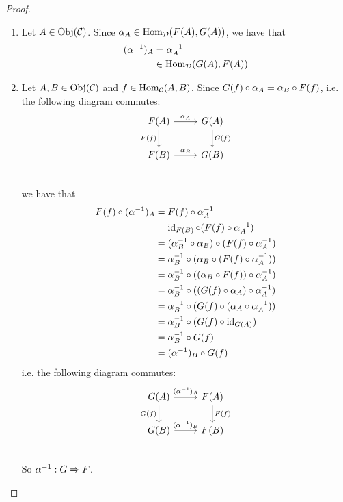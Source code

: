 \documentclass{book}
\begin{document}
	\begin{proof}\
		\begin{enumerate}
			\item Let $A \in \operatorname{Obj}(\mathcal{C})$. Since $\alpha_A \in \operatorname{Hom}_{\mathcal{D}}(F(A), G(A))$, we have that 
			\begin{align*}
				(\alpha^{-1})_A
				& = \alpha_A^{-1} \\
				& \in \operatorname{Hom}_{\mathcal{D}}(G(A), F(A))
			\end{align*}
			\item Let $A, B \in \operatorname{Obj}(\mathcal{C})$ and $f \in \operatorname{Hom}_{\mathcal{C}}(A,B)$. Since $G(f) \circ \alpha_A = \alpha_B \circ F(f)$, i.e. the following diagram commutes:
			\[ 
			\begin{tikzcd}
				F(A)  \arrow[r, "\al_A"]  \arrow[d, "F(f)"']  & G(A)   \arrow[d, "G(f)"]\\
				F(B) \arrow[r, "\al_B"] &  G(B) \\
			\end{tikzcd}
			\]
			we have that 
			\begin{align*}
				F(f) \circ (\alpha^{-1})_A 
				& = F(f) \circ \alpha_A^{-1} \\
				& = \operatorname{id}_{F(B)} \circ (F(f) \circ \alpha_A^{-1}) \\
				& = (\alpha_B^{-1} \circ \alpha_B) \circ (F(f) \circ \alpha_A^{-1}) \\
				& = \alpha_B^{-1} \circ (\alpha_B \circ (F(f) \circ \alpha_A^{-1})) \\
				& = \alpha_B^{-1} \circ ((\alpha_B \circ F(f)) \circ \alpha_A^{-1}) \\
				& = \alpha_B^{-1} \circ ((G(f) \circ \alpha_A) \circ \alpha_A^{-1}) \\
				& = \alpha_B^{-1} \circ (G(f) \circ (\alpha_A \circ \alpha_A^{-1})) \\
				& = \alpha_B^{-1} \circ (G(f) \circ \operatorname{id}_{G(A)}) \\
				& = \alpha_B^{-1} \circ G(f) \\
				& = (\alpha^{-1})_B \circ G(f) 
			\end{align*}
			i.e. the following diagram commutes:
			\[ 
			\begin{tikzcd}
				G(A)  \arrow[r, "(\al^{-1})_A"]  \arrow[d, "G(f)"']  & F(A)   \arrow[d, "F(f)"]\\
				G(B) \arrow[r, "(\al^{-1})_B"] &  F(B) \\
			\end{tikzcd}
			\]
			So $\alpha^{-1}: G \Rightarrow F$.
		\end{enumerate}
	\end{proof}
	
\end{document}
